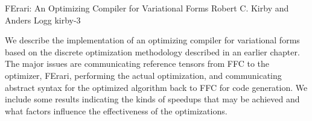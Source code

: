               {FErari: An Optimizing Compiler for Variational Forms}
              {Robert C. Kirby and Anders Logg}
              {kirby-3}

We describe the implementation of an optimizing compiler for
variational forms based on the discrete optimization methodology
described in an earlier chapter. The major issues are communicating
reference tensors from FFC to the optimizer, FErari, performing the
actual optimization, and communicating abstract syntax for the
optimized algorithm back to FFC for code generation.  We include some
results indicating the kinds of speedups that may be achieved and what
factors influence the effectiveness of the optimizations.
